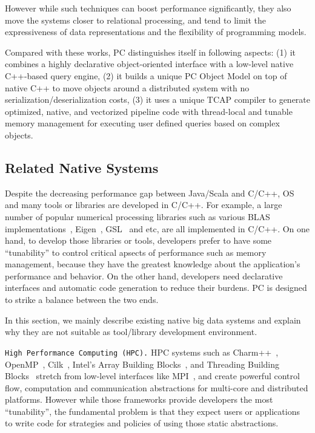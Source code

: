 However while
such techniques can boost performance significantly, they also move the
systems closer to relational processing, and tend to limit the
expressiveness of data representations and the flexibility of
programming models.


\vspace{5pt}
Compared with these works, 
PC distinguishes itself in following aspects:
(1) it combines a highly declarative object-oriented interface with a
low-level native
C++-based query engine, (2) it builds a unique PC Object Model on top of
native C++ to move objects around a distributed system with no
serialization/deserialization costs, (3) it uses a unique TCAP
compiler to generate optimized, native, and vectorized
pipeline code with thread-local and tunable memory management for executing
user defined queries based on complex objects.

\subsection {Related Native Systems}
Despite the decreasing performance gap between Java/Scala and C/C++,
OS and many tools or libraries are developed in C/C++. For example,
a large number of popular numerical processing libraries such as
various BLAS implementations~\cite{barrachina2008evaluation}, Eigen~\cite{eigen}, GSL~\cite{gsl}
and etc, are all implemented in C/C++. 
On one hand, to
develop those libraries or tools, developers prefer to have some ``tunability'' to control critical apsects of performance such as
memory management, because they have the greatest knowledge about the
application's performance and behavior. On the other hand,
developers need declarative interfaces and automatic code generation
to reduce their burdens. PC is designed to strike a balance between
the two ends. 

In this section, we mainly describe existing native big
data systems and explain why they are not suitable as tool/library
development environment.

\vspace{5pt} 
\texttt{High Performance Computing (HPC).} HPC
systems such as Charm++~\cite{kale1993charm++}, OpenMP~\cite{dagum1998openmp}, Cilk~\cite{blumofe1996cilk},  Intel's Array Building
Blocks~\cite{newburn2011intel}, and Threading Building Blocks~\cite{reinders2007intel} stretch from
low-level interfaces like MPI~\cite{gropp1996high}, and create powerful control flow, computation
and communication abstractions for multi-core and distributed
platforms. However while those frameworks provide developers the most
``tunability'', the fundamental problem is that they expect users
or applications to write code for strategies and policies of using
those static abstractions. 


